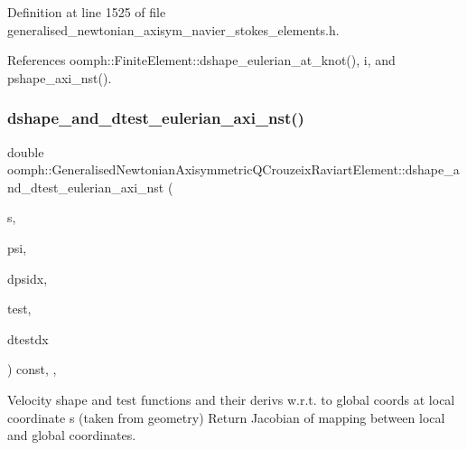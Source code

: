 Definition at line 1525 of file generalised\+\_\+newtonian\+\_\+axisym\+\_\+navier\+\_\+stokes\+\_\+elements.\+h.



References oomph\+::\+Finite\+Element\+::dshape\+\_\+eulerian\+\_\+at\+\_\+knot(), i, and pshape\+\_\+axi\+\_\+nst().

\mbox{\label{classoomph_1_1GeneralisedNewtonianAxisymmetricQCrouzeixRaviartElement_a790d9775c51bfb95506c334f4fc3ec95}} 
\subsubsection{\texorpdfstring{dshape\+\_\+and\+\_\+dtest\+\_\+eulerian\+\_\+axi\+\_\+nst()}{dshape\_and\_dtest\_eulerian\_axi\_nst()}}
{\footnotesize\ttfamily double oomph\+::\+Generalised\+Newtonian\+Axisymmetric\+Q\+Crouzeix\+Raviart\+Element\+::dshape\+\_\+and\+\_\+dtest\+\_\+eulerian\+\_\+axi\+\_\+nst (\begin{DoxyParamCaption}\item[{const \hyperlink{classoomph_1_1Vector}{Vector}$<$ double $>$ \&}]{s,  }\item[{\hyperlink{classoomph_1_1Shape}{Shape} \&}]{psi,  }\item[{\hyperlink{classoomph_1_1DShape}{D\+Shape} \&}]{dpsidx,  }\item[{\hyperlink{classoomph_1_1Shape}{Shape} \&}]{test,  }\item[{\hyperlink{classoomph_1_1DShape}{D\+Shape} \&}]{dtestdx }\end{DoxyParamCaption}) const\hspace{0.3cm}{\ttfamily [inline]}, {\ttfamily [protected]}, {\ttfamily [virtual]}}



Velocity shape and test functions and their derivs w.\+r.\+t. to global coords at local coordinate s (taken from geometry) Return Jacobian of mapping between local and global coordinates. 

